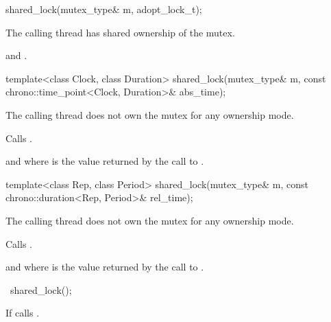 %
\begin{itemdecl}
shared_lock(mutex_type& m, adopt_lock_t);
\end{itemdecl}

\begin{itemdescr}
\pnum
\expects
The calling thread has shared ownership of the mutex.

\pnum
\ensures
{} and .
\end{itemdescr}

%
\begin{itemdecl}
template<class Clock, class Duration>
  shared_lock(mutex_type& m,
              const chrono::time_point<Clock, Duration>& abs_time);
\end{itemdecl}

\begin{itemdescr}
\pnum
\expects
The calling thread does not own the mutex for any ownership mode.

\pnum
\effects
Calls .

\pnum
\ensures
{} and 
where 
is the value returned by the call to .
\end{itemdescr}

%
\begin{itemdecl}
template<class Rep, class Period>
  shared_lock(mutex_type& m,
              const chrono::duration<Rep, Period>& rel_time);
\end{itemdecl}

\begin{itemdescr}
\pnum
\expects
The calling thread does not own the mutex for any ownership mode.

\pnum
\effects
Calls .

\pnum
\ensures
{} and 
where  is
the value returned by the call to .
\end{itemdescr}

%
\begin{itemdecl}
~shared_lock();
\end{itemdecl}

\begin{itemdescr}
\pnum
\effects
If  calls .
\end{itemdescr}

